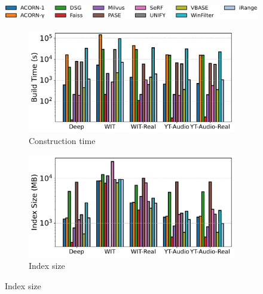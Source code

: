 \documentclass[sigconf, nonacm]{acmart}
\begin{document}
	\begin{figure}[t]
		\centering
		
		
		\hspace*{5pt}
		\includegraphics[width=0.98\columnwidth]{figures/indexData/rangeFilter_legend_only.pdf}
		
		
		\begin{subfigure}[t]{0.49\columnwidth}
			\centering
			\captionsetup{font=small}
			\includegraphics[width=\linewidth]{figures/indexData/rangeFilter_build_time_comparison_query.pdf}
			\caption{\footnotesize Construction time}
			\label{fig:rangeFilter_build_time}
		\end{subfigure}
		\hfill
		\begin{subfigure}[t]{0.49\columnwidth}
			\centering
			\includegraphics[width=\linewidth]{figures/indexData/rangeFilter_index_size_mb_comparison_query.pdf}
			\caption{\footnotesize Index size}
			\label{fig:rangeFilter_index_size_mb}
		\end{subfigure}
		\hfill

\end{figure}
\end{document}
